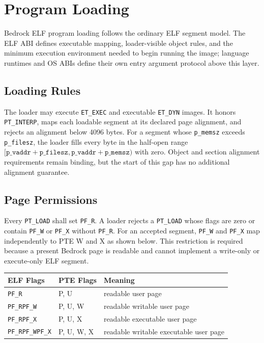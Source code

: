 \documentclass[10pt,twoside]{article}
\begin{document}
\clearpage
\section{Program Loading}\label{page:program-loading}
Bedrock ELF program loading follows the ordinary ELF segment model. The ELF ABI defines executable mapping, loader-visible object rules, and the minimum execution environment needed to begin running the image; language runtimes and OS ABIs define their own entry argument protocol above this layer.
\subsection{Loading Rules}
The loader may execute \texttt{ET\_EXEC} and executable \texttt{ET\_DYN}
images. It honors \texttt{PT\_INTERP}, maps each loadable segment at its
declared page alignment, and rejects an alignment below 4096 bytes. For a
segment whose \texttt{p\_memsz} exceeds \texttt{p\_filesz}, the loader fills
every byte in the half-open range
$[\texttt{p\_vaddr}+\texttt{p\_filesz},
\texttt{p\_vaddr}+\texttt{p\_memsz})$ with zero. Object and section alignment
requirements remain binding, but the start of this gap has no additional
alignment guarantee.
\subsection{Page Permissions}
Every \texttt{PT\_LOAD} shall set \texttt{PF\_R}. A loader rejects a
\texttt{PT\_LOAD} whose flags are zero or contain \texttt{PF\_W} or
\texttt{PF\_X} without \texttt{PF\_R}. For an accepted segment,
\texttt{PF\_W} and \texttt{PF\_X} map independently to PTE W and X as shown
below. This restriction is required because a present Bedrock page is readable
and cannot implement a write-only or execute-only ELF segment.

\begingroup\footnotesize
\setlength{\tabcolsep}{2pt}
\begin{longtable}{@{}p{1.2in}p{1.45in}p{2.85in}@{}}
\toprule
\textbf{ELF Flags} & \textbf{PTE Flags} & \textbf{Meaning}\\
\midrule
\endhead
\texttt{PF\_\allowbreak{}R} & P, U & readable user page\\
\texttt{PF\_\allowbreak{}R\textbar{}PF\_\allowbreak{}W} & P, U, W & readable writable user page\\
\texttt{PF\_\allowbreak{}R\textbar{}PF\_\allowbreak{}X} & P, U, X & readable executable user page\\
\texttt{PF\_\allowbreak{}R\textbar{}PF\_\allowbreak{}W\textbar{}PF\_\allowbreak{}X} & P, U, W, X & readable writable executable user page\\
\bottomrule
\end{longtable}
\endgroup
\end{document}
